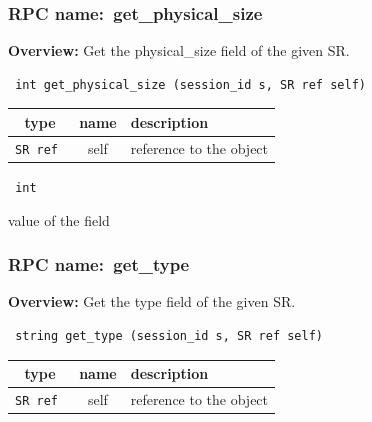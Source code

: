 \subsubsection{RPC name:~get\_physical\_size}

{\bf Overview:} 
Get the physical\_size field of the given SR.

\begin{verbatim} int get_physical_size (session_id s, SR ref self)\end{verbatim}



 
\vspace{0.3cm}
\begin{tabular}{|c|c|p{7cm}|}
 \hline
{\bf type} & {\bf name} & {\bf description} \\ \hline
{\tt SR ref } & self & reference to the object \\ \hline 

\end{tabular}

\vspace{0.3cm}

{\tt 
int
}


value of the field
\vspace{0.3cm}
\vspace{0.3cm}
\vspace{0.3cm}
\subsubsection{RPC name:~get\_type}

{\bf Overview:} 
Get the type field of the given SR.

\begin{verbatim} string get_type (session_id s, SR ref self)\end{verbatim}



 
\vspace{0.3cm}
\begin{tabular}{|c|c|p{7cm}|}
 \hline
{\bf type} & {\bf name} & {\bf description} \\ \hline
{\tt SR ref } & self & reference to the object \\ \hline 

\end{tabular}

\vspace{0.3cm}

